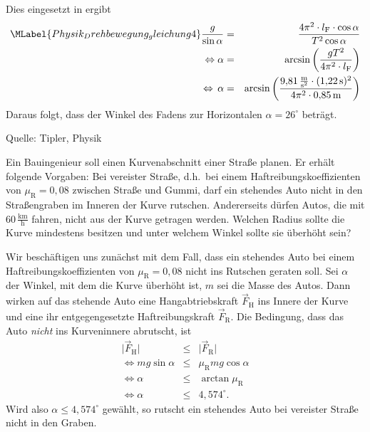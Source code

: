 \begin{MExercises}
\begin{MExercise}
\begin{MSolution}
    Dies eingesetzt in  ergibt
    \begin{eqnarray}\MLabel{Physik_Drehbewegung_gleichung4}
    \nonumber\frac{g}{\sin\alpha}&=&\frac{4\pi^2\cdot l_{\textrm{F}}\cdot\cos\alpha}{T^2\cos\alpha}\\
    \Leftrightarrow \alpha&=&\arcsin\left(\frac{gT^2}{4\pi^2\cdot l_{\textrm{F}}}\right)\\
    \nonumber\,\Leftrightarrow\, \alpha&=&\arcsin\left(\frac{9{,}81\,\frac{\text{m}}{\text{s}^2}\cdot(1{,}22\,\text{s})^2}{4\pi^2\cdot 0{,}85\,\text{m}}\right)
    \end{eqnarray} Daraus folgt, dass der Winkel des Fadens zur Horizontalen $\alpha=26^{\circ}$ betr\"agt.
  \end{MSolution}
  
  Quelle: Tipler, Physik
  \end{MExercise}
  
  
  \begin{MExercise}
  Ein Bauingenieur soll einen Kurvenabschnitt einer Stra{\ss}e planen. Er erh\"alt folgende Vorgaben: Bei vereister Stra{\ss}e, d.h.~bei einem Haftreibungskoeffizienten von $\mu_{\textrm{R}}=0{,}08$ zwischen Stra{\ss}e und Gummi, darf ein stehendes Auto nicht in den Stra{\ss}engraben im Inneren der Kurve rutschen. Andererseits d\"urfen Autos, die mit $60\,\frac{\text{km}}{\text{h}}$ fahren, nicht aus der Kurve getragen werden. Welchen Radius sollte die Kurve mindestens besitzen und unter welchem Winkel sollte sie \"uberh\"oht sein?
  
  \begin{MSolution}
  Wir besch\"aftigen uns zun\"achst mit dem Fall, dass ein stehendes Auto bei einem Haftreibungskoeffizienten von $\mu_{\textrm{R}}=0{,}08$ nicht ins Rutschen geraten soll. Sei $\alpha$ der Winkel, mit dem die Kurve \"uberh\"oht ist, $m$ sei die Masse des Autos. Dann wirken auf das stehende Auto eine Hangabtriebskraft $\vec{F}_{\textrm{H}}$ ins Innere der Kurve und eine ihr entgegengesetzte Haftreibungskraft $\vec{F}_{\textrm{R}}$. Die Bedingung, dass das Auto \emph{nicht} ins Kurveninnere abrutscht, ist
  \begin{eqnarray*}
  \vert\vec{F}_{\textrm{H}}\vert&\le&\vert\vec{F}_{\textrm{R}}\vert\\
  \Leftrightarrow mg\sin\alpha&\le& \mu_{\textrm{R}} mg\cos\alpha\\
  \Leftrightarrow \alpha&\le&\arctan\mu_{\textrm{R}}\\
  \Leftrightarrow \alpha&\le& 4{,}574^{\circ}.
  \end{eqnarray*} Wird also $\alpha\le 4{,}574^{\circ}$ gew\"ahlt, so rutscht ein stehendes Auto bei vereister Stra{\ss}e nicht in den Graben.\\
  

\end{MSolution}
\end{MExercise}
\end{MExercises}
